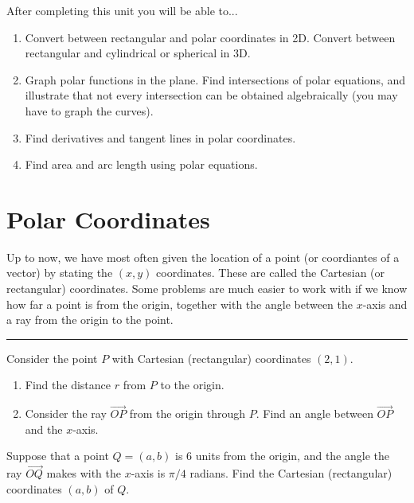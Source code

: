 
\noindent 
After completing this unit you will be able to...
\begin{enumerate}

\item Convert between rectangular and polar coordinates in 2D. Convert between rectangular and cylindrical or spherical in 3D.
\item Graph polar functions in the plane. Find intersections of polar equations, and illustrate that not every intersection can be obtained algebraically (you may have to graph the curves).
\item Find derivatives and tangent lines in polar coordinates.
\item Find area and arc length using polar equations.

\end{enumerate}

\newpage

\section{Polar Coordinates}
Up to now, we have most often given the location of a point (or coordiantes of a vector) by stating the $(x,y)$ coordinates.  These are called the Cartesian (or rectangular) coordinates.  Some problems are much easier to work with if we know how far a point is from the origin, together with the angle between the $x$-axis and a ray from the origin to the point.

\vskip0.2in

\hrule

\begin{problem}
%
Consider the point $P$ with Cartesian (rectangular) coordinates $(2,1)$.
\begin{enumerate}
\item Find the distance $r$ from $P$ to the origin. 
\item Consider the ray $\stackrel{\rightarrow}{OP}$ from the origin through $P$. Find an angle between $\vec{OP}$ and the $x$-axis.\\
[Hint: Use a triangle and trigonometry]
\end{enumerate}

\end{problem}
\begin{problem}
Suppose that a point $Q=(a,b)$ is 6 units from the origin, and the angle the ray $\vec{OQ}$ makes with the $x$-axis is $\pi/4$ radians.  Find the Cartesian (rectangular) coordinates $(a,b)$ of $Q$.
\end{problem}

